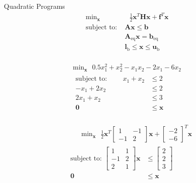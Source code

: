 \documentclass{article}
\begin{document}
Quadratic Programs
\begin{align*}
    \text{min}_{\mathbf{x}}& \text{ } \frac{1}{2}\mathbf{x}^T \mathbf{H} \mathbf{x} + \mathbf{f}^T \mathbf{x} \\
    \mbox{subject to: }& \mathbf{A}\mathbf{x} \le \mathbf{b}\\
                       & \mathbf{A}_\text{eq}\mathbf{x} = \mathbf{b}_\text{eq}\\
                       & \mathbf{l}_{\text{b}} \le \mathbf{x} \le \mathbf{u}_{\text{b}}\\
\end{align*}

\begin{align*}
    \text{min}_{\mathbf{x}} \text{ } 0.5x_1^2 + x_2^2 - x_1x_2 - 2x_1 - 6x_2\\
    \begin{aligned}
    \mbox{subject to: } \qquad x_1 + x_2 &\le 2\\
                        -x_1 + 2x_2 &\le 2\\
                        2x_1 + x_2 &\le 3\\
                        \mathbf{0} &\le \mathbf{x}\\
    \end{aligned}
\end{align*}

\begin{align*}
    &\qquad \text{min}_{\mathbf{x}} \text{ } \frac{1}{2}\mathbf{x}^T \begin{bmatrix} 1 & -1 \\ -1 & 2 \end{bmatrix} \mathbf{x} +
                                        \begin{bmatrix} -2 \\ -6 \end{bmatrix}^T \mathbf{x}\\
    &\begin{aligned}
    \mbox{subject to: } \begin{bmatrix} 1 & 1 \\ -1 & 2 \\ 2 & 1 \end{bmatrix} \mathbf{x} &\le \begin{bmatrix} 2 \\ 2 \\ 3 \end{bmatrix}\\
                        \mathbf{0} &\le \mathbf{x}\\
    \end{aligned}
\end{align*}
\end{document}
